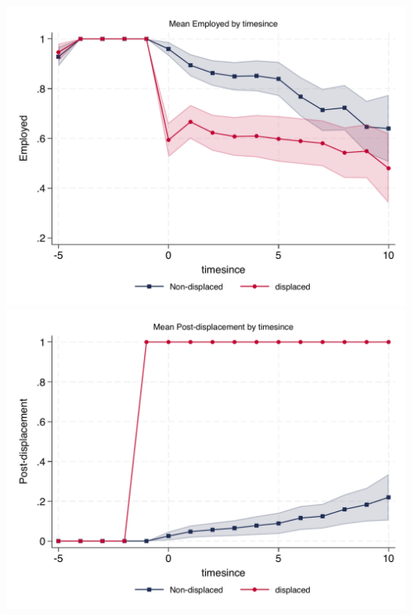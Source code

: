 \documentclass{article}
\begin{document}
\includegraphics[width = .9\textwidth]{Disp_event_raw/employed_by_timesince.pdf} \\ 
\includegraphics[width = .9\textwidth]{Disp_event_raw/displaced_by_timesince.pdf} \\ 
\end{document}
